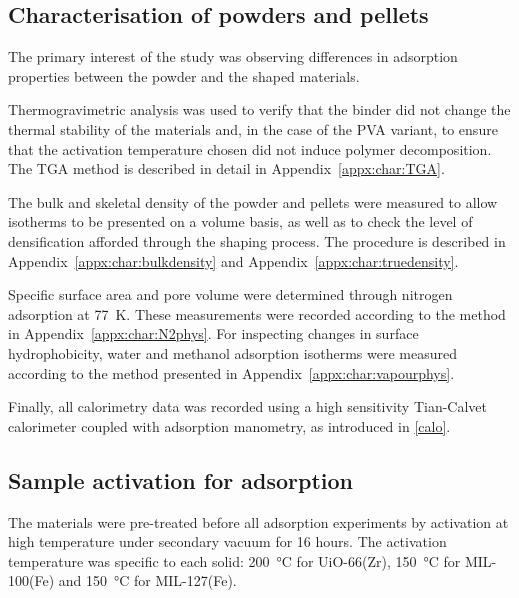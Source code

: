 \subsection{Characterisation of powders and pellets}

The primary interest of the study was observing differences
in adsorption properties between the powder and the shaped materials.

Thermogravimetric analysis was used to verify that the binder
did not change the thermal stability of the materials and, in the
case of the PVA variant, to ensure that the activation temperature
chosen did not induce polymer decomposition. The TGA method is described
in detail in Appendix~\ref{appx:char:TGA}.

The bulk and skeletal density of the powder and pellets were measured
to allow isotherms to be presented on a volume basis, as well as
to check the level of densification afforded through the
shaping process. The procedure is described in Appendix~\ref{appx:char:bulkdensity} and Appendix~\ref{appx:char:truedensity}.

Specific surface area and pore volume were determined through
nitrogen adsorption at \SI{77}{\kelvin}. These measurements were
recorded according to the method in Appendix~\ref{appx:char:N2phys}.
For inspecting changes in surface hydrophobicity, water and
methanol adsorption isotherms were measured according to
the method presented in Appendix~\ref{appx:char:vapourphys}.

Finally, all calorimetry data was recorded using a high sensitivity
Tian-Calvet calorimeter coupled with adsorption manometry, as
introduced in \autoref{calo}.

\subsection{Sample activation for adsorption}

The materials were pre-treated before all adsorption experiments by
activation at high temperature under secondary vacuum for 16 hours.
The activation temperature was specific
to each solid: \SI{200}{\degreeCelsius} for UiO-66(Zr),
\SI{150}{\degreeCelsius} for MIL-100(Fe) and \SI{150}{\degreeCelsius}
for MIL-127(Fe).
